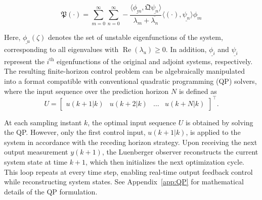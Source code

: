 \begin{equation} \label{eq:terminal_cost}
    \mathfrak{P} (\cdot) = \sum_{m=0}^{\infty} \sum_{n=0}^{\infty} 
    -\frac{
        \langle \underline{\phi_m} , \mathfrak{Q} \underline{\psi_n} \rangle
    }{
        \lambda_m + \overline{\lambda_n}
    }
    \langle (\cdot) , \underline{\psi_n} \rangle \phi_m
\end{equation}

Here, $\underline{\phi_u}(\zeta)$ denotes the set of unstable eigenfunctions of the system, corresponding to all eigenvalues with $\operatorname{Re}(\lambda_u) \geq 0$. In addition, $\underline{\phi_i}$ and $\underline{\psi_i}$ represent the $i^{\text{th}}$ eigenfunctions of the original and adjoint systems, respectively. The resulting finite-horizon control problem can be algebraically manipulated into a format compatible with conventional quadratic programming (QP) solvers, where the input sequence over the prediction horizon $N$ is defined as
\[
U = \begin{bmatrix} u(k+1|k) & u(k+2|k) & \dots & u(k+N|k) \end{bmatrix}^\top.
\]

At each sampling instant $k$, the optimal input sequence $U$ is obtained by solving the QP. However, only the first control input, $u(k+1|k)$, is applied to the system in accordance with the receding horizon strategy. Upon receiving the next output measurement $y(k+1)$, the Luenberger observer reconstructs the current system state at time $k+1$, which then initializes the next optimization cycle. This loop repeats at every time step, enabling real-time output feedback control while reconstructing system states. See Appendix~\ref{app:QP} for mathematical details of the QP formulation.

